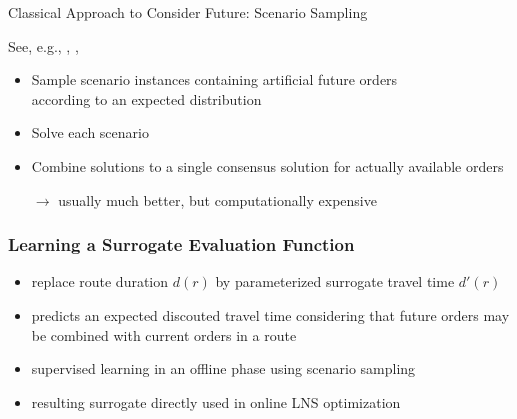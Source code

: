 \documentclass[aspectratio=1610]{beamer}
\newcommand{\important}[1]{{\color{green!60!black}#1}}
\begin{document}
\begin{frame}{Classical Approach to Consider Future: Scenario Sampling}

See, e.g., \cite{voccia2019same}, \cite{Bent2004}, \cite{Hvattum2006}

\bigskip
\begin{itemize}
	\itemsep2ex
	\item \important{Sample scenario instances} containing artificial future orders\\ according to an expected distribution
	\item \important{Solve} each scenario
	\item Combine solutions to a single \important{consensus solution} for actually available orders
	\item[$\rightarrow$] usually \important{much better}, but \alert{computationally expensive}
\end{itemize}
\end{frame}


\begin{frame}
	\frametitle{Learning a Surrogate Evaluation Function}
	
	{\small\color{gray}\cite{bracher-21}}
	
	\vfill
	
	\bigskip
	\begin{itemize}
		\itemsep2ex
		\item replace route duration $d(r)$ by parameterized \important{surrogate travel time} $d'(r)$
		\item predicts an expected \important{discouted travel time} considering that future orders may be combined with current orders in a route
		\item \important{supervised learning} in an \important{offline} phase using \important{scenario sampling}
		\item resulting surrogate directly used in online LNS optimization
	\end{itemize}
	\bigskip
\end{frame}
\end{document}
